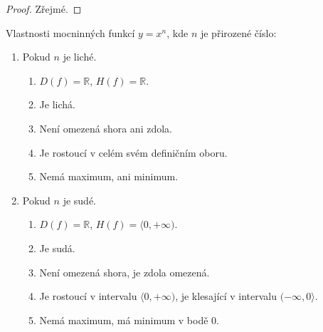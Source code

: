 \begin{proof}
    Zřejmé.
\end{proof}

\begin{veta}
  Vlastnosti mocninných funkcí $y= x^n$, kde $n$ je přirozené číslo:
  \begin{enumerate}[1.]
    \item Pokud $n$ je liché.
    \begin{enumerate}[$i.$]
      \item $D(f)= \mathbb R$, $H(f)= \mathbb R$.
      \item Je lichá.
      \item Není omezená shora ani zdola.
      \item Je rostoucí v celém svém definičním oboru.
      \item Nemá maximum, ani minimum.
    \end{enumerate}
    \item Pokud $n$ je sudé.
    \begin{enumerate}[$i.$]
      \item $D(f)= \mathbb R$, $H(f)= \langle 0,+\infty )$.
      \item Je sudá.
      \item Není omezená shora, je zdola omezená.
      \item Je rostoucí v intervalu $\langle 0,+\infty )$, je klesající v intervalu $( -\infty,0 \rangle $.
      \item Nemá maximum, má minimum v bodě $0$.
    \end{enumerate}
  \end{enumerate}
\end{veta}

